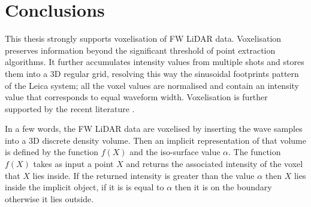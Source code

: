 \documentclass{subfiles}
\begin{document}
\section{Conclusions}
This thesis strongly supports voxelisation of FW LiDAR data. Voxelisation preserves information beyond the significant threshold of point extraction algorithms. It further accumulates intensity values from multiple shots and stores them into a 3D regular grid, resolving this way the sinusoidal footprints pattern of the Leica system; all the voxel values are normalised and contain an intensity value that corresponds to equal waveform width. Voxelisation is further supported by the recent literature \cite{Cao2016} \cite{Sumnall2016}. 

In a few words, the FW LiDAR data are voxelised by inserting the wave samples into a 3D discrete density volume. Then an implicit representation of that volume is defined by the function $f(X)$ and the iso-surface value $\alpha$. The function $f(X)$ takes as input a point $X$ and returns the associated intensity of the voxel that $X$ lies inside. If the returned intensity is greater than the value $\alpha$ then $X$ lies inside the implicit object, if it is is equal to $\alpha$ then it is on the boundary otherwise it lies outside. 
\end{document}
